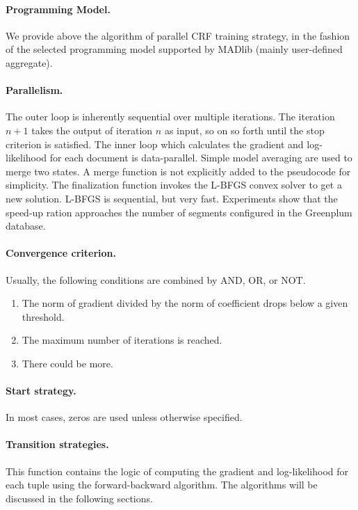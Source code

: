 \paragraph{Programming Model.}
We provide above the algorithm of parallel CRF training strategy, in the fashion of the selected programming model supported by MADlib (mainly user-defined aggregate).

\paragraph{Parallelism.}
The outer loop is inherently sequential over multiple iterations.
The iteration $n+1$ takes the output of iteration $n$ as input, so on so forth until the stop criterion is satisfied.
The inner loop which calculates the gradient and log-likelihood for each document is data-parallel.
Simple model averaging are used to merge two states.
A merge function is not explicitly added to the pseudocode for simplicity.
The finalization function invokes the L-BFGS convex solver to get a new solution. L-BFGS is sequential, but very fast.
Experiments show that the speed-up ration approaches the number of segments configured in the Greenplum database.

\paragraph{Convergence criterion.}
Usually, the following conditions are combined by AND, OR, or NOT.
\begin{enumerate}
    \item The norm of gradient divided by the norm of coefficient drops below a given threshold.
    \item The maximum number of iterations is reached.
    \item There could be more.
\end{enumerate}

\paragraph{Start strategy.}
In most cases, zeros are used unless otherwise specified.

\paragraph{Transition strategies.}
This function contains the logic of computing the gradient and log-likelihood for each tuple using the forward-backward
algorithm. The algorithms will be discussed in the following sections.

